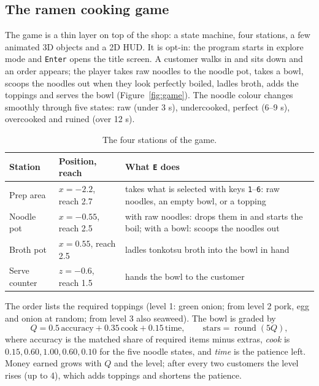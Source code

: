 \documentclass[10pt,a4paper]{article}
\newcommand{\code}[1]{\texttt{\small #1}}
\begin{document}
\subsection{The ramen cooking game}\label{sec:game}
The game is a thin layer on top of the shop: a state machine, four stations, a few animated 3D objects and a 2D HUD. It is opt-in: the program starts in explore mode and \code{Enter} opens the title screen. A customer walks in and sits down and an order appears; the player takes raw noodles to the noodle pot, takes a bowl, scoops the noodles out when they look perfectly boiled, ladles broth, adds the toppings and serves the bowl (Figure~\ref{fig:game}). The noodle colour changes smoothly through five states: raw (under 3 s), undercooked, perfect (6--9 s), overcooked and ruined (over 12 s).
\begin{table}[htbp]
\centering\small
\begin{tabular}{@{}p{3.0cm}p{3.0cm}p{9.9cm}@{}}
\toprule
\textbf{Station} & \textbf{Position, reach} & \textbf{What \code{E} does}\\
\midrule
Prep area & $x=-2.2$, reach 2.7 & takes what is selected with keys \code{1}--\code{6}: raw noodles, an empty bowl, or a topping\\
Noodle pot & $x=-0.55$, reach 2.5 & with raw noodles: drops them in and starts the boil; with a bowl: scoops the noodles out\\
Broth pot & $x=0.55$, reach 2.5 & ladles tonkotsu broth into the bowl in hand\\
Serve counter & $z=-0.6$, reach 1.5 & hands the bowl to the customer\\
\bottomrule
\end{tabular}
\caption{The four stations of the game.}\label{tab:stations}
\end{table}
The order lists the required toppings (level 1: green onion; from level 2 pork, egg and onion at random; from level 3 also seaweed). The bowl is graded by
\begin{equation}
Q=0.5\,\text{accuracy}+0.35\,\text{cook}+0.15\,\text{time},\qquad \text{stars}=\operatorname{round}(5Q),
\end{equation}
where accuracy is the matched share of required items minus extras, \emph{cook} is $0.15,0.60,1.00,0.60,0.10$ for the five noodle states, and \emph{time} is the patience left. Money earned grows with $Q$ and the level; after every two customers the level rises (up to 4), which adds toppings and shortens the patience.
\end{document}
